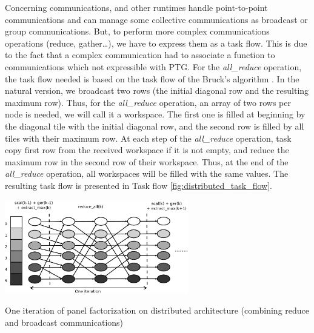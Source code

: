 Concerning communications, \dague and other runtimes handle point-to-point communications and can manage some collective communications as broadcast or group communications. But, to perform more complex communications operations (reduce, gather\dots), we have to express them as a task flow. 
This is due to the fact that a complex communication had to associate a function to communications which not expressible with PTG. For the \emph{all\_reduce} operation, the task flow needed is based on the task flow of the Bruck's algorithm \cite{BruckEtAl97}.
In the natural version, we broadcast two rows (the initial diagonal row and the resulting maximum row). Thus, for the \emph{all\_reduce} operation, an array of two rows per node is needed, we will call it a workspace. The first one is filled at beginning by the diagonal tile with the initial diagonal row, and the second row is filled by all tiles with their maximum row. At each step of the \textit{all\_reduce} operation, task copy first row from the received workspace if it is not empty, and reduce the maximum row in the second row of their workspace. Thus, at the end of the \textit{all\_reduce} operation, all workspaces will be filled with the same values.
The resulting task flow is presented in Task flow \ref{fig:distributed_task_flow}.

\begin{taskflow}[!ht]
\centering
\includegraphics[width=0.6\textwidth]{figures/distributed_tf_bw.pdf}
\caption{One iteration of panel factorization on distributed architecture (combining reduce and broadcast communications)\label{fig:distributed_task_flow}}

\end{taskflow}

